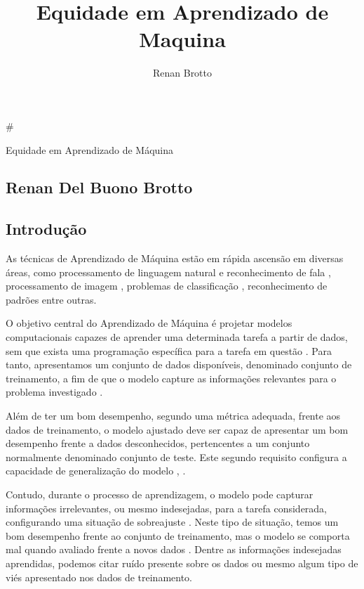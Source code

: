 \documentclass[11pt]{article}
\title{Equidade em Aprendizado de Maquina}
\author{Renan Brotto}
\begin{document}
    
    
    \maketitle
    
    

    
    \#

Equidade em Aprendizado de Máquina

\hypertarget{renan-del-buono-brotto}{%
\subsection{Renan Del Buono Brotto}\label{renan-del-buono-brotto}}

\hypertarget{introduuxe7uxe3o}{%
\subsection{Introdução}\label{introduuxe7uxe3o}}

As técnicas de Aprendizado de Máquina estão em rápida ascensão em
diversas áreas, como processamento de linguagem natural e reconhecimento
de fala \cite{Kamath2019}, processamento de imagem \cite{Cipolla2013},
problemas de classificação \cite{Duda2000}, reconhecimento de padrões
\cite{Bishop2006} entre outras.

O objetivo central do Aprendizado de Máquina é projetar modelos
computacionais capazes de aprender uma determinada tarefa a partir de
dados, sem que exista uma programação específica para a tarefa em
questão \cite{Samuel1959}. Para tanto, apresentamos um conjunto de dados
disponíveis, denominado conjunto de treinamento, a fim de que o modelo
capture as informações relevantes para o problema investigado
\cite{Hastie2009}.

Além de ter um bom desempenho, segundo uma métrica adequada, frente aos
dados de treinamento, o modelo ajustado deve ser capaz de apresentar um
bom desempenho frente a dados desconhecidos, pertencentes a um conjunto
normalmente denominado conjunto de teste. Este segundo requisito
configura a capacidade de generalização do modelo \cite{Bishop2006},
\cite{haykin-rn}.

Contudo, durante o processo de aprendizagem, o modelo pode capturar
informações irrelevantes, ou mesmo indesejadas, para a tarefa
considerada, configurando uma situação de sobreajuste \cite{haykin-rn}.
Neste tipo de situação, temos um bom desempenho frente ao conjunto de
treinamento, mas o modelo se comporta mal quando avaliado frente a novos
dados \cite{Bishop2006}. Dentre as informações indesejadas aprendidas,
podemos citar ruído presente sobre os dados \cite{Bishop2006} ou mesmo
algum tipo de viés apresentado nos dados de treinamento.
\end{document}
